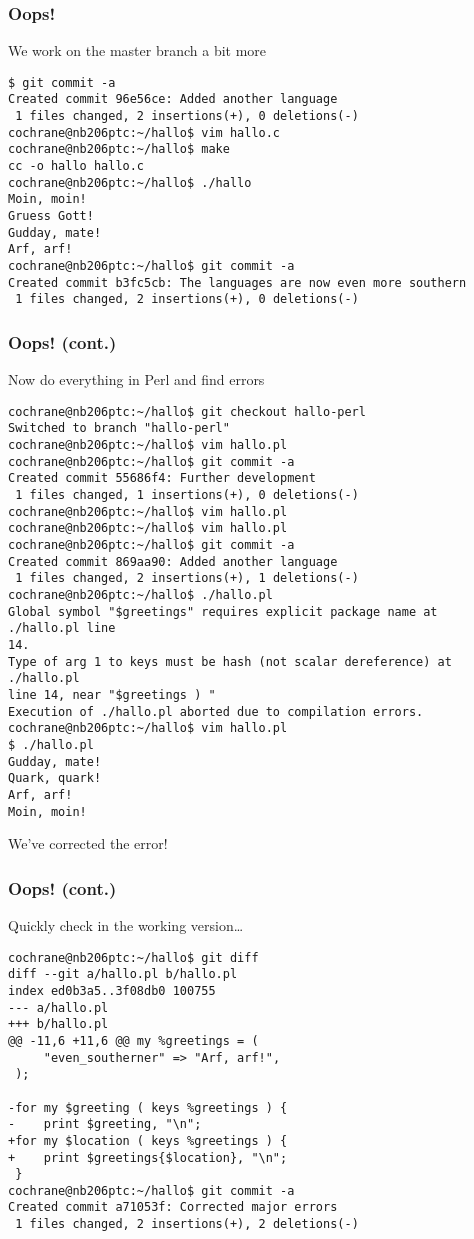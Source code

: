 \begin{frame}[fragile]
\frametitle{Oops!}

We work on the master branch a bit more
\begin{lstlisting}[basicstyle=\tiny\ttfamily\color{black}]
$ git commit -a
Created commit 96e56ce: Added another language
 1 files changed, 2 insertions(+), 0 deletions(-)
cochrane@nb206ptc:~/hallo$ vim hallo.c
cochrane@nb206ptc:~/hallo$ make
cc -o hallo hallo.c
cochrane@nb206ptc:~/hallo$ ./hallo
Moin, moin!
Gruess Gott!
Gudday, mate!
Arf, arf!
cochrane@nb206ptc:~/hallo$ git commit -a
Created commit b3fc5cb: The languages are now even more southern
 1 files changed, 2 insertions(+), 0 deletions(-)
\end{lstlisting}
\end{frame}

\begin{frame}[fragile]
\frametitle{Oops! (cont.)}

Now do everything in Perl and find errors
\begin{lstlisting}[basicstyle=\tiny\ttfamily\color{black}]
cochrane@nb206ptc:~/hallo$ git checkout hallo-perl
Switched to branch "hallo-perl"
cochrane@nb206ptc:~/hallo$ vim hallo.pl
cochrane@nb206ptc:~/hallo$ git commit -a
Created commit 55686f4: Further development
 1 files changed, 1 insertions(+), 0 deletions(-)
cochrane@nb206ptc:~/hallo$ vim hallo.pl
cochrane@nb206ptc:~/hallo$ vim hallo.pl
cochrane@nb206ptc:~/hallo$ git commit -a
Created commit 869aa90: Added another language
 1 files changed, 2 insertions(+), 1 deletions(-)
cochrane@nb206ptc:~/hallo$ ./hallo.pl
Global symbol "$greetings" requires explicit package name at ./hallo.pl line
14.
Type of arg 1 to keys must be hash (not scalar dereference) at ./hallo.pl
line 14, near "$greetings ) "
Execution of ./hallo.pl aborted due to compilation errors.
cochrane@nb206ptc:~/hallo$ vim hallo.pl
$ ./hallo.pl
Gudday, mate!
Quark, quark!
Arf, arf!
Moin, moin!
\end{lstlisting}
We've corrected the error!
\end{frame}

\begin{frame}[fragile]
\frametitle{Oops! (cont.)}

Quickly check in the working version\ldots
\begin{lstlisting}[basicstyle=\tiny\ttfamily\color{black}]
cochrane@nb206ptc:~/hallo$ git diff
diff --git a/hallo.pl b/hallo.pl
index ed0b3a5..3f08db0 100755
--- a/hallo.pl
+++ b/hallo.pl
@@ -11,6 +11,6 @@ my %greetings = (
     "even_southerner" => "Arf, arf!",
 );
 
-for my $greeting ( keys %greetings ) {
-    print $greeting, "\n";
+for my $location ( keys %greetings ) {
+    print $greetings{$location}, "\n";
 }
cochrane@nb206ptc:~/hallo$ git commit -a
Created commit a71053f: Corrected major errors
 1 files changed, 2 insertions(+), 2 deletions(-)
\end{lstlisting}
\end{frame}

